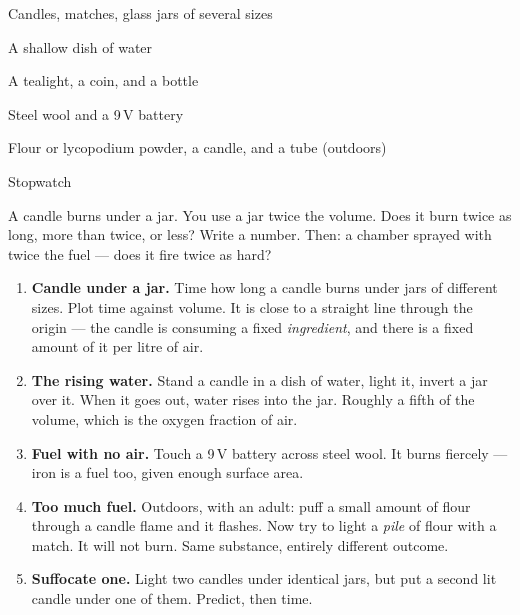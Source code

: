 



\begin{materials}
\item Candles, matches, glass jars of several sizes
\item A shallow dish of water
\item A tealight, a coin, and a bottle
\item Steel wool and a 9\,V battery
\item Flour or lycopodium powder, a candle, and a tube (outdoors)
\item Stopwatch
\end{materials}

\begin{predict}
A candle burns under a jar. You use a jar twice the volume. Does it burn twice
as long, more than twice, or less? Write a number. Then: a chamber sprayed with
twice the fuel --- does it fire twice as hard?
\end{predict}

\begin{enumerate}
\item \textbf{Candle under a jar.} Time how long a candle burns under jars of different sizes. Plot time against volume. It is close to a straight line through the origin --- the candle is consuming a fixed \emph{ingredient}, and there is a fixed amount of it per litre of air.
\item \textbf{The rising water.} Stand a candle in a dish of water, light it, invert a jar over it. When it goes out, water rises into the jar. Roughly a fifth of the volume, which is the oxygen fraction of air.
\item \textbf{Fuel with no air.} Touch a 9\,V battery across steel wool. It burns fiercely --- iron is a fuel too, given enough surface area.
\item \textbf{Too much fuel.} Outdoors, with an adult: puff a small amount of flour through a candle flame and it flashes. Now try to light a \emph{pile} of flour with a match. It will not burn. Same substance, entirely different outcome.
\item \textbf{Suffocate one.} Light two candles under identical jars, but put a second lit candle under one of them. Predict, then time.
\end{enumerate}

